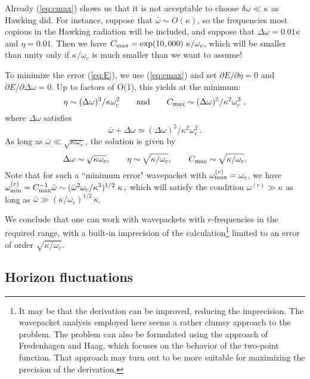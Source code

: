 \documentclass[12pt]{article}
\def\o{\omega}
\def\obar{\bar{\omega}}
\def\cmax{C_{\rm max}}
\begin{document}
Already (\ref{eq:cmax}) shows us that it is not acceptable
to choose $\delta\o\ll\kappa$ as Hawking did. For instance,
suppose that $\obar\sim O(\kappa)$, so the frequencies most
copious in the Hawking radiation will be included,
and suppose that $\Delta\o=0.01\kappa$ and $\eta=0.01$.
Then we have $\cmax=\exp(10,000)\; \kappa/\o_c$,
which will be smaller than unity only if $\kappa/\o_c$ is
much smaller than we want to assume!

To minimize the error (\ref{eq:E}), we use (\ref{eq:cmax}) and
set $\partial E/\partial \eta=0$ and
$\partial E/\partial \Delta\o=0$.
Up to factors of O(1), this yields at the minimum:
\begin{equation}
\eta\sim(\Delta\o)^3/\kappa\o_c^2
\qquad {\rm and} \qquad
\cmax\sim(\Delta\o)^5/\kappa^2\o_c^3\; ,
\end{equation}
where $\Delta\o$ satisfies
\begin{equation}
\obar+\Delta\o\simeq(\Delta\o)^5/\kappa^2\o_c^2\, .
\end{equation}
As long as $\obar\ll \sqrt{\kappa\o_c}$, the solution is
given by
\begin{equation}
\Delta\o\sim \sqrt{\kappa\o_c},
\qquad \eta\sim\sqrt{\kappa/\o_c},
\qquad \cmax\sim\sqrt{\kappa/\o_c}.
\label{eq:error}
\end{equation}
Note that for such a ``minimum error" wavepacket with
$\o^{(r)}_{\rm max}=\o_c$, we have
$\o^{(r)}_{\rm min}=\cmax^{-1}\obar
\sim (\obar^2\o_c/\kappa^3)^{1/2}\; \kappa\, ,$
which will satisfy the condition $\o^{(r)}\gg \kappa$
as long as $\obar\gg(\kappa/\o_c)^{1/2}\, \kappa$.

We conclude that one can work with wavepackets with $r$-frequencies
in the required range, with a built-in imprecision of the
calculation\footnote{It may be that the derivation can be improved,
reducing the
imprecision. The wavepacket analysis employed here seems a rather
clumsy approach to the problem. The problem can also be
formulated using the approach of Fredenhagen and
Haag\cite{FredHaag}, which focuses on the behavior of the two-point
function. That approach may turn out to be more suitable for
maximizing the precision of the derivation.}
limited to an error of order $\sqrt{\kappa/\o_c}$.

\subsection{Horizon fluctuations}
\label{subsec:horfluct}
\end{document}
